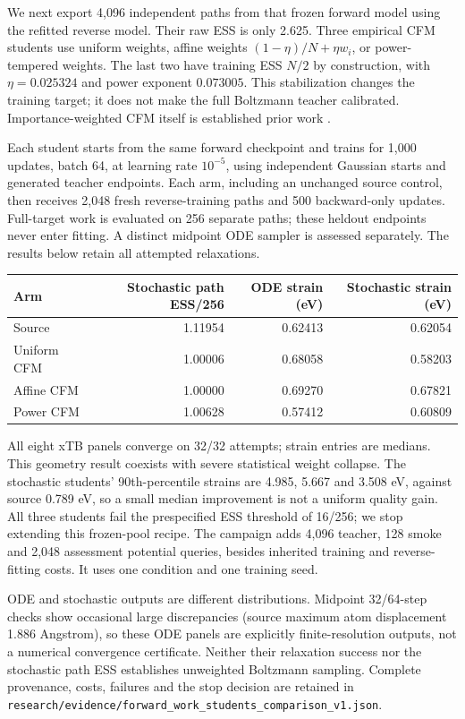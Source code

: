 We next export 4,096 independent paths from that frozen forward model using
the refitted reverse model. Their raw ESS is only 2.625. Three empirical CFM
students use uniform weights, affine weights $(1-\eta)/N+\eta w_i$, or
power-tempered weights. The last two have training ESS $N/2$ by construction,
with $\eta=0.025324$ and power exponent $0.073005$. This stabilization changes
the training target; it does not make the full Boltzmann teacher calibrated.
Importance-weighted CFM itself is established prior work \citep{ewfm}.

Each student starts from the same forward checkpoint and trains for 1,000
updates, batch 64, at learning rate $10^{-5}$, using independent Gaussian
starts and generated teacher endpoints. Each arm, including an unchanged
source control, then receives 2,048 fresh reverse-training paths and 500
backward-only updates. Full-target work is evaluated on 256 separate paths;
these heldout endpoints never enter fitting. A distinct midpoint ODE sampler
is assessed separately. The results below retain all attempted relaxations.

\begin{center}
\begin{tabular}{lrrr}
\toprule
Arm & Stochastic path ESS/256 & ODE strain (eV) & Stochastic strain (eV)\\
\midrule
Source & 1.11954 & 0.62413 & 0.62054\\
Uniform CFM & 1.00006 & 0.68058 & 0.58203\\
Affine CFM & 1.00000 & 0.69270 & 0.67821\\
Power CFM & 1.00628 & 0.57412 & 0.60809\\
\bottomrule
\end{tabular}
\end{center}

All eight xTB panels converge on 32/32 attempts; strain entries are medians.
This geometry result coexists with severe statistical weight collapse. The
stochastic students' 90th-percentile strains are 4.985, 5.667 and 3.508 eV,
against source 0.789 eV, so a small median improvement is not a uniform quality
gain. All three students fail the prespecified ESS threshold of 16/256;
we stop extending this frozen-pool recipe. The campaign adds 4,096 teacher,
128 smoke and 2,048 assessment potential queries, besides inherited training
and reverse-fitting costs. It uses one condition and one training seed.

ODE and stochastic outputs are different distributions. Midpoint 32/64-step
checks show occasional large discrepancies (source maximum atom displacement
1.886 Angstrom), so these ODE panels are explicitly finite-resolution outputs,
not a numerical convergence certificate. Neither their relaxation success nor
the stochastic path ESS establishes unweighted Boltzmann sampling. Complete
provenance, costs, failures and the stop decision are retained in
\texttt{research/evidence/forward\_work\_students\_comparison\_v1.json}.

